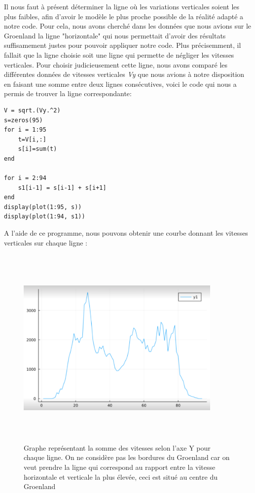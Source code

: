 \documentclass{article}
\begin{document}
\newpage
Il nous faut à présent déterminer la ligne où les variations verticales soient les plus faibles, afin d'avoir le modèle le plus proche possible de la réalité adapté a notre code.
\newline
Pour cela, nous avons cherché dans les données que nous avions sur le Groenland la ligne "horizontale" qui nous permettait d'avoir des résultats suffisamement justes pour pouvoir appliquer notre code. Plus précisemment, il fallait que la ligne choisie soit une ligne qui permette de négliger les vitesses verticales.
Pour choisir judicieusement cette ligne, nous avons comparé les différentes données de vitesses verticales \textit{Vy} que nous avions à notre disposition en faisant une somme entre deux lignes consécutives, voici le code qui nous a permis de trouver  la ligne correspondante: 
\begin{verbatim}
V = sqrt.(Vy.^2)
s=zeros(95)
for i = 1:95
    t=V[i,:]
    s[i]=sum(t)
end

for i = 2:94
    s1[i-1] = s[i-1] + s[i+1]
end
display(plot(1:95, s))
display(plot(1:94, s1))
\end{verbatim}
A l'aide de ce programme, nous pouvons obtenir une courbe donnant les vitesses verticales sur chaque ligne :
\begin{figure}[!htpb]
\centering
\includegraphics[width=10cm, keepaspectratio=true, height=10cm]{Vitesses.png}
\caption{Graphe représentant la somme des vitesses selon l'axe Y pour chaque ligne. On ne considère pas les bordures du Groenland car on veut prendre la ligne qui correspond au rapport entre la vitesse horizontale et verticale la plus élevée, ceci est situé au centre du Groenland }
\end{figure}
\end{document}
